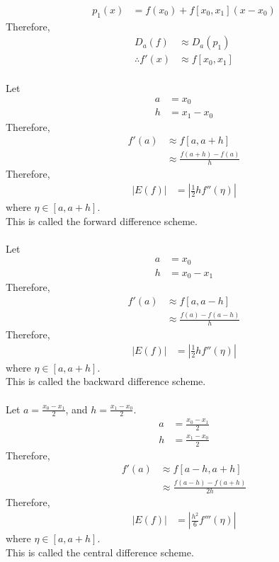 \documentclass[fleqn, a4paper, 12pt, twoside, titlepage]{article}
\theoremstyle{definition}
\theoremstyle{theorem}
\begin{document}
\begin{align*}
	p_1(x) &= f(x_0) + f[x_0,x_1] (x - x_0)
\end{align*}
Therefore,
\begin{align*}
	D_a(f) &\approx D_a(p_1)\\
	\therefore f'(x) &\approx f[x_0,x_1]
\end{align*}
~\\
Let 
\begin{align*}
	a &= x_0\\
	h &= x_1 - x_0
\end{align*}
Therefore,
\begin{align*}
	f'(a) &\approx f[a,a + h]\\
	&\approx \frac{f(a + h) - f(a)}{h}
\end{align*}
Therefore,
\begin{align*}
	\left| E(f) \right| &= \left| \frac{1}{2} h f''(\eta) \right|
\end{align*}
where $\eta \in [a,a + h]$.\\
This is called the forward difference scheme.\\
~\\
Let
\begin{align*}
	a &= x_0\\
	h &= x_0 - x_1
\end{align*}
Therefore,
\begin{align*}
	f'(a) &\approx f[a,a - h]\\
	&\approx \frac{f(a) - f(a - h)}{h}
\end{align*}
Therefore,
\begin{align*}
	\left| E(f) \right| &= \left| \frac{1}{2} h f''(\eta) \right|
\end{align*}
where $\eta \in [a,a + h]$.\\
This is called the backward difference scheme.\\
~\\
Let $a = \frac{x_0 - x_1}{2}$, and $h = \frac{x_1 - x_0}{2}$.\\
\begin{align*}
	a &= \frac{x_0 - x_1}{2}\\
	h &= \frac{x_1 - x_0}{2}
\end{align*}
Therefore,
\begin{align*}
	f'(a) &\approx f[a - h,a + h]\\
	&\approx \frac{f(a - h) - f(a + h)}{2 h}
\end{align*}
Therefore,
\begin{align*}
	\left| E(f) \right| &= \left| \frac{h^2}{6} f'''(\eta) \right|
\end{align*}
where $\eta \in [a,a + h]$.\\
This is called the central difference scheme.\\
\end{document}
